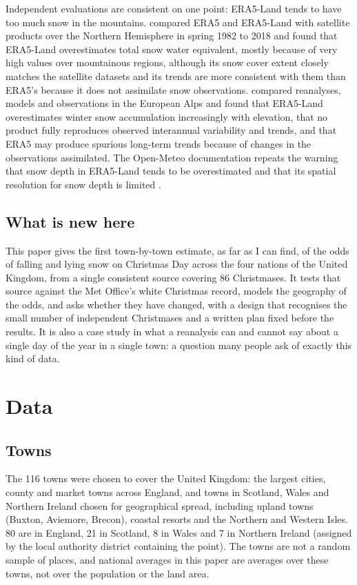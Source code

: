 \documentclass[11pt,a4paper]{article}
\begin{document}
Independent evaluations are consistent on one point: ERA5-Land tends to have too much snow in the mountains. \citet{kouki2023} compared ERA5 and ERA5-Land with satellite products over the Northern Hemisphere in spring 1982 to 2018 and found that ERA5-Land overestimates total snow water equivalent, mostly because of very high values over mountainous regions, although its snow cover extent closely matches the satellite datasets and its trends are more consistent with them than ERA5's because it does not assimilate snow observations. \citet{monteiro2023} compared reanalyses, models and observations in the European Alps and found that ERA5-Land overestimates winter snow accumulation increasingly with elevation, that no product fully reproduces observed interannual variability and trends, and that ERA5 may produce spurious long-term trends because of changes in the observations assimilated. The Open-Meteo documentation repeats the warning that snow depth in ERA5-Land tends to be overestimated and that its spatial resolution for snow depth is limited \citep{zippenfenig2023}.

\subsection{What is new here}
This paper gives the first town-by-town estimate, as far as I can find, of the odds of falling and lying snow on Christmas Day across the four nations of the United Kingdom, from a single consistent source covering 86 Christmases. It tests that source against the Met Office's white Christmas record, models the geography of the odds, and asks whether they have changed, with a design that recognises the small number of independent Christmases and a written plan fixed before the results. It is also a case study in what a reanalysis can and cannot say about a single day of the year in a single town: a question many people ask of exactly this kind of data.

\section{Data}\label{sec:data}
\subsection{Towns}
The 116 towns were chosen to cover the United Kingdom: the largest cities, county and market towns across England, and towns in Scotland, Wales and Northern Ireland chosen for geographical spread, including upland towns (Buxton, Aviemore, Brecon), coastal resorts and the Northern and Western Isles. 80 are in England, 21 in Scotland, 8 in Wales and 7 in Northern Ireland (assigned by the local authority district containing the point). The towns are not a random sample of places, and national averages in this paper are averages over these towns, not over the population or the land area.
\end{document}
